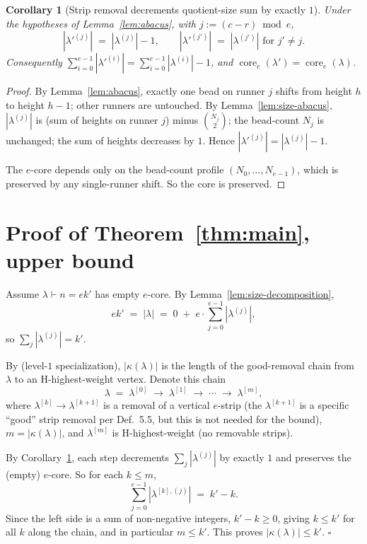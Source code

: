 \documentclass[11pt]{article}
\newtheorem{corollary}[theorem]{Corollary}
\theoremstyle{definition}
\begin{document}
\begin{corollary}[Strip removal decrements quotient-size sum by exactly $1$]
\label{cor:decrement}
Under the hypotheses of Lemma~\ref{lem:abacus}, with $j := (c - r) \bmod e$,
\[
    |\lambda'^{(j)}| \;=\; |\lambda^{(j)}| - 1, \qquad
    |\lambda'^{(j')}| \;=\; |\lambda^{(j')}| \text{ for } j' \neq j.
\]
Consequently $\sum_{i=0}^{e-1} |\lambda'^{(i)}| = \sum_{i=0}^{e-1}
|\lambda^{(i)}| - 1$, and $\operatorname{core}_e(\lambda') =
\operatorname{core}_e(\lambda)$.
\end{corollary}

\begin{proof}
By Lemma~\ref{lem:abacus}, exactly one bead on runner $j$ shifts from height
$h$ to height $h - 1$; other runners are untouched. By
Lemma~\ref{lem:size-abacus}, $|\lambda^{(j)}|$ is (sum of heights on runner
$j$) minus $\binom{N_j}{2}$; the bead-count $N_j$ is unchanged; the sum of
heights decreases by $1$. Hence $|\lambda'^{(j)}| = |\lambda^{(j)}| - 1$.

The $e$-core depends only on the bead-count profile $(N_0, \ldots, N_{e-1})$,
which is preserved by any single-runner shift. So the core is preserved.
\end{proof}

\section{Proof of Theorem~\ref{thm:main}, upper bound}
\label{sec:proof-upper}

Assume $\lambda \vdash n = ek'$ has empty $e$-core. By
Lemma~\ref{lem:size-decomposition},
\[
    ek' \;=\; |\lambda| \;=\; 0 \;+\; e \cdot \sum_{j=0}^{e-1} |\lambda^{(j)}|,
\]
so $\sum_j |\lambda^{(j)}| = k'$.

By \cite[Prop.~3.12(4)]{Gerber} (level-$1$ specialization), $|\kappa(\lambda)|$
is the length of the good-removal chain from $\lambda$ to an H-highest-weight
vertex. Denote this chain
\[
    \lambda \;=\; \lambda^{[0]} \;\to\; \lambda^{[1]} \;\to\; \cdots \;\to\;
    \lambda^{[m]},
\]
where $\lambda^{[k]} \to \lambda^{[k+1]}$ is a removal of a vertical $e$-strip
(the $\lambda^{[k+1]}$ is a specific ``good'' strip removal per Def.~5.5, but
this is not needed for the bound), $m = |\kappa(\lambda)|$, and $\lambda^{[m]}$
is H-highest-weight (no removable strips).

By Corollary~\ref{cor:decrement}, each step decrements $\sum_j |\lambda^{(j)}|$
by exactly $1$ and preserves the (empty) $e$-core. So for each $k \le m$,
\[
    \sum_{j=0}^{e-1} |\lambda^{[k], (j)}| \;=\; k' - k.
\]
Since the left side is a sum of non-negative integers, $k' - k \ge 0$, giving
$k \le k'$ for all $k$ along the chain, and in particular $m \le k'$.
This proves $|\kappa(\lambda)| \le k'$. $\square$
\end{document}
